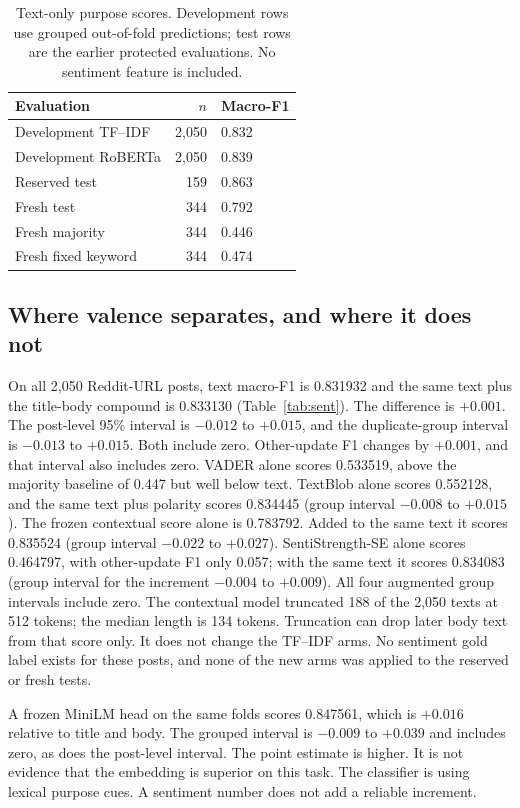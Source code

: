 \documentclass[conference,letterpaper]{IEEEtran}
\begin{document}
\begin{table}[t]
\caption{Text-only purpose scores. Development rows use grouped out-of-fold predictions; test rows are the earlier protected evaluations. No sentiment feature is included.}
\label{tab:purpose}
\centering
\footnotesize
\begin{tabular}{lrl}
\toprule
Evaluation & $n$ & Macro-F1 \\
\midrule
Development TF--IDF & 2,050 & 0.832 \\
Development RoBERTa & 2,050 & 0.839 \\
Reserved test & 159 & 0.863 \\
Fresh test & 344 & 0.792 \\
Fresh majority & 344 & 0.446 \\
Fresh fixed keyword & 344 & 0.474 \\
\bottomrule
\end{tabular}
\end{table}

\subsection{Where valence separates, and where it does not}
On all 2,050 Reddit-URL posts, text macro-F1 is 0.831932 and the same text plus the title-body compound is 0.833130 (Table~\ref{tab:sent}). The difference is $+0.001$. The post-level 95\% interval is $-0.012$ to $+0.015$, and the duplicate-group interval is $-0.013$ to $+0.015$. Both include zero. Other-update F1 changes by $+0.001$, and that interval also includes zero. VADER alone scores 0.533519, above the majority baseline of 0.447 but well below text. TextBlob alone scores 0.552128, and the same text plus polarity scores 0.834445 (group interval $-0.008$ to $+0.015$). The frozen contextual score alone is 0.783792. Added to the same text it scores 0.835524 (group interval $-0.022$ to $+0.027$). SentiStrength-SE alone scores 0.464797, with other-update F1 only 0.057; with the same text it scores 0.834083 (group interval for the increment $-0.004$ to $+0.009$). All four augmented group intervals include zero. The contextual model truncated 188 of the 2,050 texts at 512 tokens; the median length is 134 tokens. Truncation can drop later body text from that score only. It does not change the TF--IDF arms. No sentiment gold label exists for these posts, and none of the new arms was applied to the reserved or fresh tests.

A frozen MiniLM head on the same folds scores 0.847561, which is $+0.016$ relative to title and body. The grouped interval is $-0.009$ to $+0.039$ and includes zero, as does the post-level interval. The point estimate is higher. It is not evidence that the embedding is superior on this task. The classifier is using lexical purpose cues. A sentiment number does not add a reliable increment.
\end{document}
